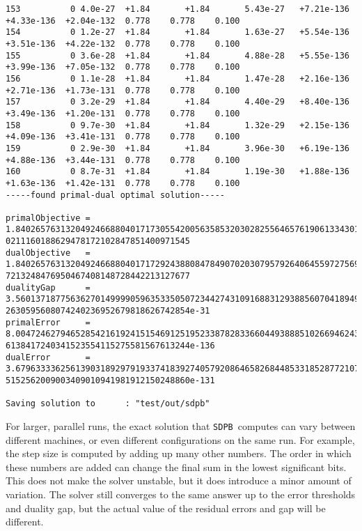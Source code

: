 \documentclass[12pt]{article}
\numberwithin{equation}{section}
\newcommand\SDPB{\texttt{SDPB}}
\begin{document}
\begin{lstlisting}
153          0 4.0e-27  +1.84       +1.84       5.43e-27   +7.21e-136  +4.33e-136  +2.04e-132  0.778    0.778    0.100
154          0 1.2e-27  +1.84       +1.84       1.63e-27   +5.54e-136  +3.51e-136  +4.22e-132  0.778    0.778    0.100
155          0 3.6e-28  +1.84       +1.84       4.88e-28   +5.55e-136  +3.99e-136  +7.05e-132  0.778    0.778    0.100
156          0 1.1e-28  +1.84       +1.84       1.47e-28   +2.16e-136  +2.71e-136  +1.73e-131  0.778    0.778    0.100
157          0 3.2e-29  +1.84       +1.84       4.40e-29   +8.40e-136  +3.49e-136  +1.20e-131  0.778    0.778    0.100
158          0 9.7e-30  +1.84       +1.84       1.32e-29   +2.15e-136  +4.09e-136  +3.41e-131  0.778    0.778    0.100
159          0 2.9e-30  +1.84       +1.84       3.96e-30   +6.19e-136  +4.88e-136  +3.44e-131  0.778    0.778    0.100
160          0 8.7e-31  +1.84       +1.84       1.19e-30   +1.88e-136  +1.63e-136  +1.42e-131  0.778    0.778    0.100
-----found primal-dual optimal solution-----

primalObjective = 1.84026576313204924668804017173055420056358532030282556465761906133430166726537336826049865612094019
0211160188629478172102847851400971545
dualObjective   = 1.84026576313204924668804017172924388084784907020307957926406455972756967820389551729116356865203683
7213248476950467408148728442213127677
dualityGap      = 3.56013718775636270149999059635335050723442743109168831293885607041894974620853522385695676694435617
2630595608074240236952679818626742854e-31
primalError     = 8.00472462794652854216192415154691251952338782833660449388851026694624386819579233719251965820695076
6138417240341523554115275581567613244e-136
dualError       = 3.67963333625613903189297919337418392740579208646582684485331852877210732905668816990827126132539445
5152562009003409010941981912150248860e-131

Saving solution to      : "test/out/sdpb"
\end{lstlisting}

For larger, parallel runs, the exact solution that \SDPB\ computes can
vary between different machines, or even different configurations on
the same run.  For example, the step size is computed by adding up
many other numbers.  The order in which these numbers are added can
change the final sum in the lowest significant bits.  This does not
make the solver unstable, but it does introduce a minor amount of
variation.  The solver still converges to the same answer up to the
error thresholds and duality gap, but the actual value of the residual
errors and gap will be different.
\end{document}
